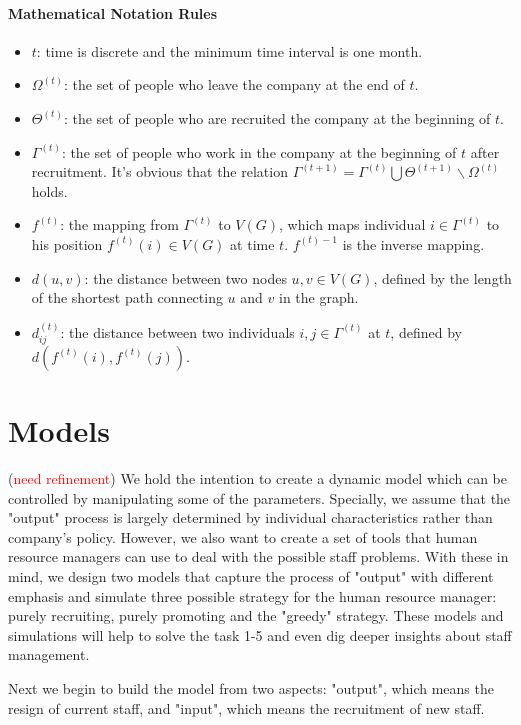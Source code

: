 \documentclass[tcn = 37075, sheet = true, abstract = true]{mcmthesis}
\begin{document}
\paragraph{Mathematical Notation Rules}
\begin{itemize}
\item $t$: time is discrete and the minimum time interval is one month.
\item $\Omega^{(t)}$: the set of people who leave the company at the end of $t$. \item $\Theta^{(t)}$: the set of people who are recruited the company at the beginning of $t$. 
\item $\Gamma^{(t)}$: the set of people who work in the company at the beginning of $t$ after recruitment. It's obvious that the relation $\Gamma^{(t+1)}=\Gamma^{(t)}\bigcup \Theta ^{(t+1)} \backslash \Omega^{(t)}$ holds.
\item $f^{(t)}$: the mapping from $\Gamma^{(t)}$ to $V(G)$, which maps individual $i\in \Gamma^{(t)}$ to his position $f^{(t)}(i) \in V(G)$ at time $t$. $f^{(t)-1}$ is the inverse mapping.
\item $d(u,v)$: the distance between two nodes $u, v\in V(G)$, defined by the length of the shortest path connecting $u$ and $v$ in the graph.
\item $d_{ij}^{(t)}$: the distance between two individuals $i, j\in  \Gamma^{(t)}$ at $t$, defined by $d(f^{(t)}(i),f^{(t)}(j))$.
\end{itemize}


\section{Models}

(\textcolor{red}{need refinement}) We hold the intention to create a dynamic model which can be controlled by manipulating some of the parameters. Specially, we assume that the "output" process is largely determined by individual characteristics rather than company's policy. However, we also want to create a set of tools that human resource managers can use to deal with the possible staff problems. With these in mind, we design two models that capture the process of "output" with different emphasis and simulate three possible strategy for the human resource manager: purely recruiting, purely promoting and the "greedy" strategy. These models and simulations will help to solve the task 1-5 and even dig deeper insights about staff management. 

Next we begin to build the model from two aspects: "output", which means the resign of current staff, and "input", which means the recruitment of new staff.
\end{document}
